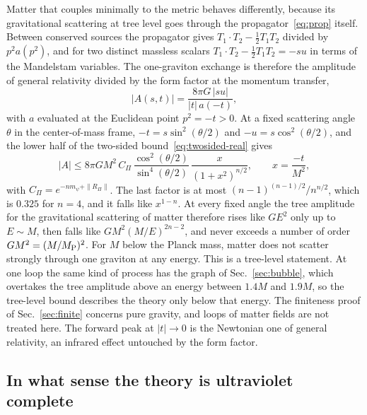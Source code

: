\documentclass[aps,prd,10pt,twocolumn,superscriptaddress,nofootinbib,floatfix,longbibliography]{revtex4-2}
\begin{document}
Matter that couples minimally to the metric behaves differently, because its gravitational scattering at tree level goes through the propagator~\eqref{eq:prop} itself. Between conserved sources the propagator gives $T_1\!\cdot T_2-\frac12T_1T_2$ divided by $p^2a(p^2)$, and for two distinct massless scalars $T_1\!\cdot T_2-\frac12T_1T_2=-su$ in terms of the Mandelstam variables. The one-graviton exchange is therefore the amplitude of general relativity divided by the form factor at the momentum transfer,
\begin{equation}
\label{eq:matter}
|A(s,t)|=\frac{8\pi G\,|su|}{|t|\,a(-t)} ,
\end{equation}
with $a$ evaluated at the Euclidean point $p^2=-t>0$. At a fixed scattering angle $\theta$ in the center-of-mass frame, $-t=s\sin^2(\theta/2)$ and $-u=s\cos^2(\theta/2)$, and the lower half of the two-sided bound~\eqref{eq:twosided-real} gives
\[
|A|\le8\pi GM^2\,C_\Pi\,\frac{\cos^2(\theta/2)}{\sin^4(\theta/2)}\,\frac{x}{(1+x^2)^{n/2}},\qquad x=\frac{-t}{M^2},
\]
with $C_\Pi=e^{-nm_\psi+\|R_\Pi\|}$. The last factor is at most $(n-1)^{(n-1)/2}/n^{n/2}$, which is $0.325$ for $n=4$, and it falls like $x^{1-n}$. At every fixed angle the tree amplitude for the gravitational scattering of matter therefore rises like $GE^2$ only up to $E\sim M$, then falls like $GM^2(M/E)^{2n-2}$, and never exceeds a number of order $GM^2=(M/M_{\rm P})^2$. For $M$ below the Planck mass, matter does not scatter strongly through one graviton at any energy. This is a tree-level statement. At one loop the same kind of process has the graph of Sec.~\ref{sec:bubble}, which overtakes the tree amplitude above an energy between $1.4M$ and $1.9M$, so the tree-level bound describes the theory only below that energy. The finiteness proof of Sec.~\ref{sec:finite} concerns pure gravity, and loops of matter fields are not treated here. The forward peak at $|t|\to0$ is the Newtonian one of general relativity, an infrared effect untouched by the form factor.

\subsection{In what sense the theory is ultraviolet complete}
\label{sec:complete}
\end{document}
